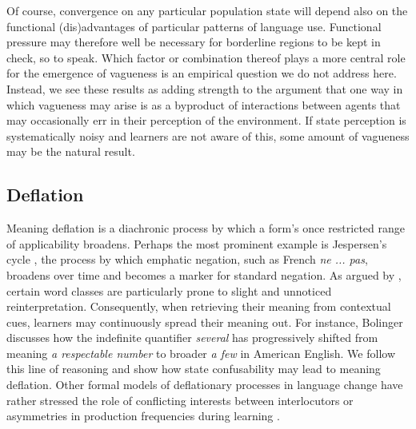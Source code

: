 \documentclass[10pt,a4paper]{article}
\begin{document}
Of course, convergence on any particular population state will depend also on the functional
(dis)advantages of particular patterns of language use. Functional pressure may therefore well
be necessary for borderline regions to be kept in check, so to speak. Which factor or
combination thereof plays a more central role for the emergence of vagueness is an empirical
question we do not address here. Instead, we see these results as adding strength to the
argument that one way in which vagueness may arise is as a byproduct of interactions between
agents that may occasionally err in their perception of the environment. If state perception is
systematically noisy and learners are not aware of this, some amount of vagueness may be the
natural result.

\subsection{Deflation}
Meaning deflation is a diachronic process by which a form's once restricted range of
applicability broadens. Perhaps the most prominent example is Jespersen's cycle
\citep{dahl:1979}, the process by which emphatic negation, such as French {\em ne ... pas},
broadens over time and becomes a marker for standard negation. As argued by
\citet{bolinger:1981}, certain word classes are particularly prone to slight and unnoticed
reinterpretation. Consequently, when retrieving their meaning from contextual cues, learners
may continuously spread their meaning out. For instance, Bolinger discusses how the indefinite
quantifier {\em several} has progressively shifted from meaning {\em a respectable number} to
broader {\em a few} in American English. We follow this line of reasoning and show how state
confusability may lead to meaning deflation. Other formal models of deflationary processes in
language change have rather stressed the role of conflicting interests between interlocutors
\citep{AhernClark2014:Diachronic-Proc} or asymmetries in production frequencies during learning
\citep{Schaden2012:Modelling-the-A,Deo2015:The-Semantic-an}.
\end{document}
